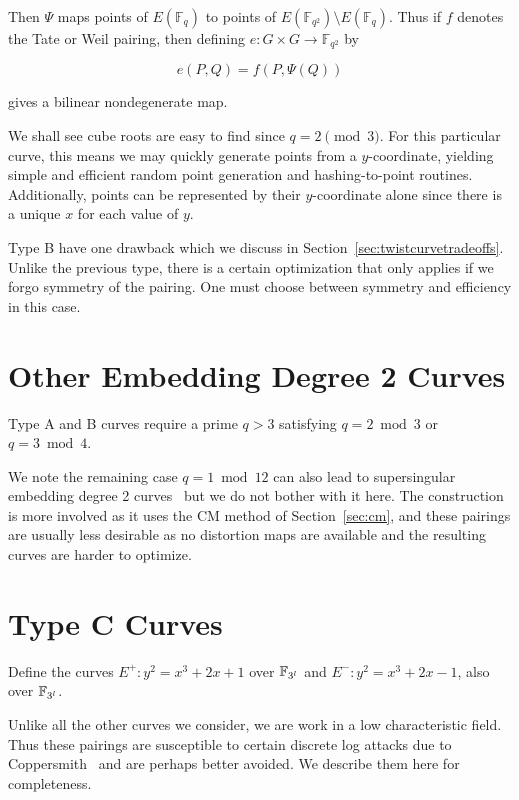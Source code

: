 Then $\Psi$ maps points of $E(\mathbb{F}_q)$ to points of
$E(\mathbb{F}_{q^2}) \setminus E(\mathbb{F}_q)$. Thus if $f$ denotes the
Tate or Weil pairing, then defining $e:G \times G \rightarrow \mathbb{F}_{q^2}$
by

\[ e(P,Q) = f(P, \Psi(Q)) \]

gives a bilinear nondegenerate map.

We shall see cube roots are easy to find since $q = 2 \pmod{3}$.
For this particular curve, this means we may quickly generate points from
a $y$-coordinate, yielding simple and efficient random point generation and
hashing-to-point routines.
Additionally,
points can be represented by their $y$-coordinate alone since there is
a unique $x$ for each value of $y$.

Type B have one drawback which we discuss in
Section~\ref{sec:twistcurvetradeoffs}. Unlike the previous type,
there is a certain optimization that
only applies if we forgo symmetry of the pairing. One must choose between
symmetry and efficiency in this case.

\section {Other Embedding Degree 2 Curves}

Type A and B curves require a prime $q > 3$ satisfying $q = 2 \bmod 3$ or
$q = 3 \bmod 4$.

We note the remaining case $q = 1 \bmod 12$ can also lead to supersingular
embedding degree 2 curves~\cite[\S 3.2]{fst} but we do not bother with it here.
The construction is more involved as it uses the CM method of
Section~\ref{sec:cm}, and these pairings are usually
less desirable as no distortion maps are available and the resulting
curves are harder to optimize.

\section {Type C Curves}

Define the curves $E^{+} : y^2 = x^3 + 2 x + 1$ over $\mathbb{F}_{3^l}$
and $E^{-} : y^2 = x^3 + 2 x - 1$, also over $\mathbb{F}_{3^l}$.

Unlike all the other curves we consider,
we are work in a low characteristic field. Thus these pairings
are susceptible to certain discrete log attacks due to
Coppersmith~\cite{coppersmith} and are perhaps better avoided.
We describe them here for completeness.

